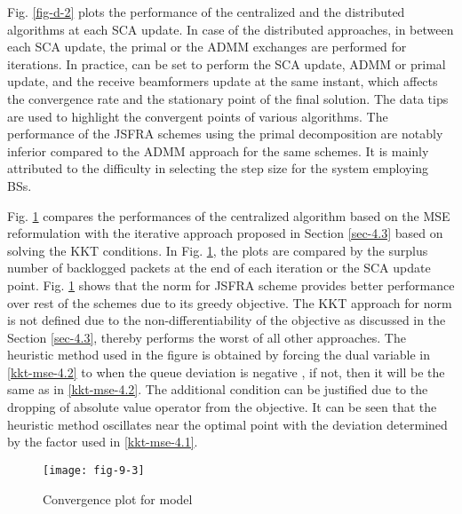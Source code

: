 Fig. \ref{fig-d-2} plots the performance of the centralized and the distributed algorithms at each \ac{SCA} update. In case of the distributed approaches, in between each \ac{SCA} update, the primal or the \ac{ADMM} exchanges are performed for  iterations. In practice,  can be set to perform the \ac{SCA} update, \ac{ADMM} or primal update, and the receive beamformers  update at the same instant, which affects the convergence rate and the stationary point of the final solution. The data tips are used to highlight the convergent points of various algorithms. The performance of the \ac{JSFRA} schemes using the primal decomposition are notably inferior compared to the \ac{ADMM} approach for the same schemes. It is mainly attributed to the difficulty in selecting the step size for the system employing  \acp{BS}.

Fig. \ref{fig-d-3.1} compares the performances of the centralized algorithm based on the \ac{MSE} reformulation with the iterative approach proposed in Section \ref{sec-4.3} based on solving the \ac{KKT} conditions. In Fig. \ref{fig-d-3.1}, the plots are compared by the surplus number of backlogged packets at the end of each iteration or the \ac{SCA} update point. Fig. \ref{fig-d-3.1} shows that the  norm for \ac{JSFRA} scheme provides better performance over rest of the schemes due to its greedy objective. The \ac{KKT} approach for  norm is not defined due to the non-differentiability of the objective as discussed in the Section \ref{sec-4.3}, thereby performs the worst of all other approaches. The heuristic method used in the figure is obtained by forcing the dual variable  in \eqref{kkt-mse-4.2} to  when the queue deviation is negative , if not, then it will be the same as in \eqref{kkt-mse-4.2}. The additional condition can be justified due to the dropping of absolute value operator from the objective. It can be seen that the heuristic method oscillates near the optimal point with the deviation determined by the factor \me{\rho} used in \eqref{kkt-mse-4.1}.
\begin{figure}
\centering
\texttt{[image: fig-9-3]}
\caption{Convergence plot for  model}
\label{fig-d-3.1}
\end{figure}

